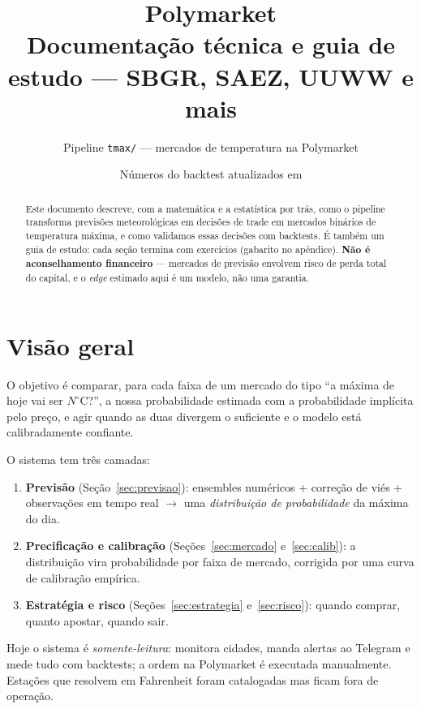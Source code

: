 \documentclass[11pt,a4paper]{article}
\title{\textbf{Polymarket}\\
  \large Documentação técnica e guia de estudo --- SBGR, SAEZ, UUWW e mais}
\author{Pipeline \texttt{tmax/} --- mercados de temperatura na Polymarket}
\date{Números do backtest atualizados em \btUpdated}
\begin{document}
\maketitle
\thispagestyle{fancy}

\begin{abstract}
\noindent Este documento descreve, com a matemática e a estatística por trás,
como o pipeline transforma previsões meteorológicas em decisões de trade em
mercados binários de temperatura máxima, e como validamos essas decisões com
backtests. É também um guia de estudo: cada seção termina com exercícios
(gabarito no apêndice). \textbf{Não é aconselhamento financeiro} --- mercados
de previsão envolvem risco de perda total do capital, e o \emph{edge} estimado
aqui é um modelo, não uma garantia.
\end{abstract}

\tableofcontents
\bigskip

\section{Visão geral}
O objetivo é comparar, para cada faixa de um mercado do tipo ``a máxima de hoje
vai ser $N^\circ$C?'', a nossa probabilidade estimada com a probabilidade
implícita pelo preço, e agir quando as duas divergem o suficiente e o modelo
está calibradamente confiante.

O sistema tem três camadas:
\begin{enumerate}
  \item \textbf{Previsão} (Seção~\ref{sec:previsao}): ensembles numéricos +
    correção de viés + observações em tempo real $\rightarrow$ uma
    \emph{distribuição de probabilidade} da máxima do dia.
  \item \textbf{Precificação e calibração} (Seções~\ref{sec:mercado}
    e~\ref{sec:calib}): a distribuição vira probabilidade por faixa de mercado,
    corrigida por uma curva de calibração empírica.
  \item \textbf{Estratégia e risco} (Seções~\ref{sec:estrategia}
    e~\ref{sec:risco}): quando comprar, quanto apostar, quando sair.
\end{enumerate}

Hoje o sistema é \emph{somente-leitura}: monitora \btStations{} cidades,
manda alertas ao Telegram e mede tudo com backtests; a ordem na Polymarket é
executada manualmente. Estações que resolvem em Fahrenheit foram catalogadas
mas ficam fora de operação.
\end{document}
